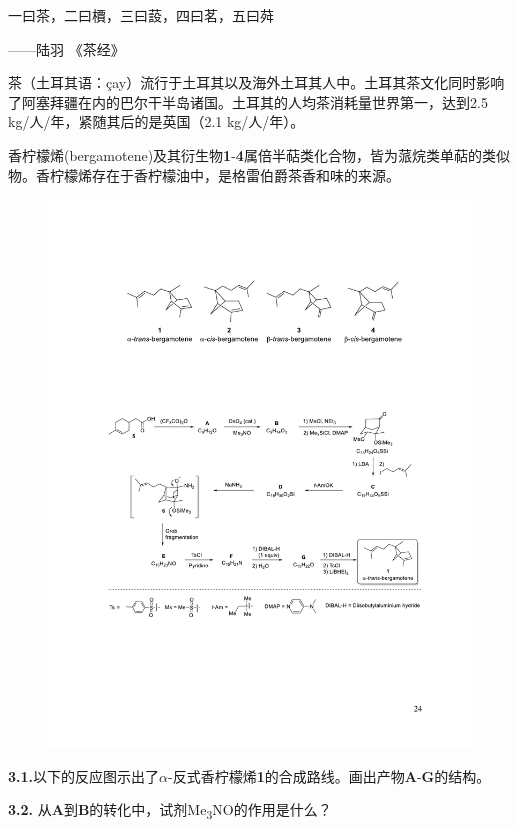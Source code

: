 一曰茶，二曰檟，三曰蔎，四曰茗，五曰荈

\begin{flushright}
------陆羽 《茶经》
\end{flushright}

茶（土耳其语：çay）流行于土耳其以及海外土耳其人中。土耳其茶文化同时影响了阿塞拜疆在内的巴尔干半岛诸国。土耳其的人均茶消耗量世界第一，达到2.5
kg/人/年，紧随其后的是英国（2.1 kg/人/年）。

香柠檬烯(bergamotene)及其衍生物\textbf{1}-\textbf{4}属倍半萜类化合物，皆为蒎烷类单萜的类似物。香柠檬烯存在于香柠檬油中，是格雷伯爵茶香和味的来源。

\begin{figure}[h]
	\centering
	\includegraphics[width=13cm]{./pic/t3-1.pdf}
\end{figure}

\noindent\textbf{3.1.}以下的反应图示出了$\alpha$-反式香柠檬烯\textbf{1}的合成路线。画出产物\textbf{A}-\textbf{G}的结构。

\noindent\textbf{3.2.} 从\textbf{A}到\textbf{B}的转化中，试剂Me\textsubscript{3}NO的作用是什么？

